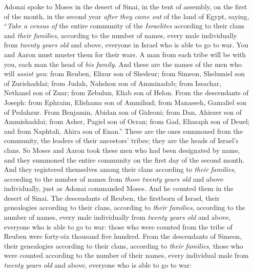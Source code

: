 
\begin{biblechapter} %
 Adonai spoke to Moses in the desert of Sinai, in the tent of assembly, on the first of the month, in the second year \textit{after they came out} of the land of Egypt, saying,
\verse “\textit{Take a census of} the entire community of the \textit{Israelites} according to their clans and \textit{their families}, according to the number of names, every male individually
\verse from \textit{twenty years old} and above, everyone in Israel who is able to go to war. You and Aaron must muster them for their wars.
\verse A man from each tribe will be with you, each man the head of \textit{his family}.
\verse And these are the names of the men who will \textit{assist you}: from Reuben, Elizur son of Shedeur;
\verse from Simeon, Shelumiel son of Zurishaddai;
\verse from Judah, Nahshon son of Amminadab;
\verse from Issachar, Nethanel son of Zuar;
\verse from Zebulun, Eliab son of Helon.
\verse From the descendants of Joseph: from Ephraim, Elishama son of Ammihud; from Manasseh, Gamaliel son of Pedahzur.
\verse From Benjamin, Abidan son of Gideoni;
\verse from Dan, Ahiezer son of Ammishaddai;
\verse from Asher, Pagiel son of Ocran;
\verse from Gad, Eliasaph son of Deuel;
\verse and from Naphtali, Ahira son of Enan.”
\verse These are the ones summoned from the community, the leaders of their ancestors’ tribes; they are the heads of Israel’s clans.
\verse So Moses and Aaron took these men who had been designated by name,
\verse and they summoned the entire community on the first day of the second month. And they registered themselves among their clans according to \textit{their families}, according to the number of names from \textit{those twenty years old} and above individually,
\verse just as Adonai commanded Moses. And he counted them in the desert of Sinai.
\verse The descendants of Reuben, the firstborn of Israel, their genealogies according to their clans, according to \textit{their families}, according to the number of names, every male individually from \textit{twenty years old} and above, everyone who is able to go to war:
\verse those who were counted from the tribe of Reuben were forty-six thousand five hundred.
\verse From the descendants of Simeon, their genealogies according to their clans, according to \textit{their families}, those who were counted according to the number of their names, every individual male from \textit{twenty years old} and above, everyone who is able to go to war:

\end{biblechapter}

